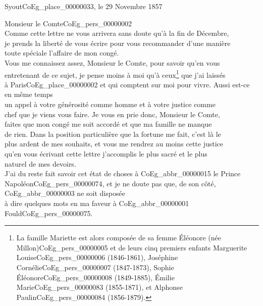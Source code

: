 \documentclass{book}
\begin{document}
\begin{flushright} Syout\gls{CoEg_place_00000033}, le 29 Novembre 1857
\end{flushright}

\hspace{1cm} Monsieur le Comte\gls{CoEg_pers_00000002}\\

Comme cette lettre ne vous arrivera sans doute qu’à la fin de Décembre,\\
je prends la liberté de vous écrire pour vous recommander d’une manière\\
toute spéciale l’affaire de mon congé.\\
\indent Vous me connaissez assez, Monsieur le Comte, pour savoir qu’en vous\\
entretenant de ce sujet, je pense moins à moi qu’à ceux\footnote{La famille Mariette est alors composée de sa femme Éléonore (née Millon)\gls{CoEg_pers_00000005} et de leurs cinq premiers enfants Marguerite Louise\gls{CoEg_pers_00000006} (1846-1861), Joséphine Cornélie\gls{CoEg_pers_00000007} (1847-1873), Sophie Éléonore\gls{CoEg_pers_00000008} (1849-1885), Émilie Marie\gls{CoEg_pers_00000083} (1855-1871), et Alphonse Paulin\gls{CoEg_pers_00000084} (1856-1879).} que j’ai laissés\\
à Paris\gls{CoEg_place_00000002} et qui comptent sur moi pour vivre. Aussi est-ce en même temps\\
un appel à votre générosité comme homme et à votre justice comme\\
chef que je viens vous faire. Je vous en prie donc, Monsieur le Comte,\\
faites que mon congé me soit accordé et que ma famille ne manque\\
de rien. Dans la position particulière que la fortune me fait, c’est là le\\
plus ardent de mes souhaits, et vous me rendrez au moins cette justice\\
qu’en vous écrivant cette lettre j’accomplis le plus sacré et le plus\\
naturel de mes devoirs.\\
\indent J’ai du reste fait savoir cet état de choses à \gls{CoEg_abbr_00000015} le Prince\\
Napoléon\gls{CoEg_pers_00000074}, et je ne doute pas que, de son côté, \gls{CoEg_abbr_00000003} ne soit disposée\\
à dire quelques mots en ma faveur à \gls{CoEg_abbr_00000001} Fould\gls{CoEg_pers_00000075}.\\
\end{document}
